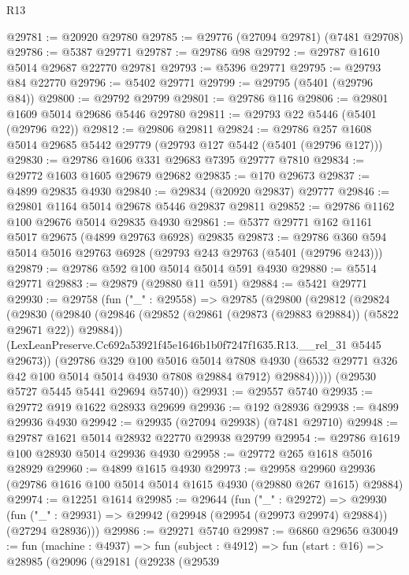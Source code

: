 \begin{lexlean}{R13}
\begin{coremodule}
@29781 := @20920 @29780
@29785 := @29776 (@27094 @29781) (@7481 @29708)
@29786 := @5387 @29771
@29787 := @29786 @98
@29792 := @29787 @1610 @5014 @29687 @22770 @29781
@29793 := @5396 @29771
@29795 := @29793 @84 @22770
@29796 := @5402 @29771
@29799 := @29795 (@5401 (@29796 @84))
@29800 := @29792 @29799
@29801 := @29786 @116
@29806 := @29801 @1609 @5014 @29686 @5446 @29780
@29811 := @29793 @22 @5446 (@5401 (@29796 @22))
@29812 := @29806 @29811
@29824 := @29786 @257 @1608 @5014 @29685 @5442 @29779 (@29793 @127 @5442 (@5401 (@29796 @127)))
@29830 := @29786 @1606 @331 @29683 @7395 @29777 @7810
@29834 := @29772 @1603 @1605 @29679 @29682
@29835 := @170 @29673
@29837 := @4899 @29835 @4930
@29840 := @29834 (@20920 @29837) @29777
@29846 := @29801 @1164 @5014 @29678 @5446 @29837 @29811
@29852 := @29786 @1162 @100 @29676 @5014 @29835 @4930
@29861 := @5377 @29771 @162 @1161 @5017 @29675 (@4899 @29763 @6928) @29835
@29873 := @29786 @360 @594 @5014 @5016 @29763 @6928 (@29793 @243 @29763 (@5401 (@29796 @243)))
@29879 := @29786 @592 @100 @5014 @5014 @591 @4930
@29880 := @5514 @29771
@29883 := @29879 (@29880 @11 @591)
@29884 := @5421 @29771
@29930 := @29758
    (fun ("_" : @29558) =>
    @29785
      (@29800
        (@29812
          (@29824
            (@29830
              (@29840
                (@29846 (@29852 (@29861 (@29873 (@29883 @29884)) (@5822 @29671 @22)) @29884))
                (LexLeanPreserve.Cc692a53921f45e1646b1b0f7247f1635.R13.__rel_31 @5445 @29673))
              (@29786
                @329
                @100
                @5016
                @5014
                @7808
                @4930
                (@6532 @29771 @326 @42 @100 @5014 @5014 @4930 @7808 @29884 @7912)
                @29884)))))
      (@29530 @5727 @5445 @5441 @29694 @5740))
@29931 := @29557 @5740
@29935 := @29772 @919 @1622 @28933 @29699
@29936 := @192 @28936
@29938 := @4899 @29936 @4930
@29942 := @29935 (@27094 @29938) (@7481 @29710)
@29948 := @29787 @1621 @5014 @28932 @22770 @29938 @29799
@29954 := @29786 @1619 @100 @28930 @5014 @29936 @4930
@29958 := @29772 @265 @1618 @5016 @28929
@29960 := @4899 @1615 @4930
@29973 := @29958
    @29960
    @29936
    (@29786 @1616 @100 @5014 @5014 @1615 @4930 (@29880 @267 @1615) @29884)
@29974 := @12251 @1614
@29985 := @29644
    (fun ("_" : @29272) =>
    @29930 (fun ("_" : @29931) => @29942 (@29948 (@29954 (@29973 @29974) @29884)) (@27294 @28936)))
@29986 := @29271 @5740
@29987 := @6860 @29656
@30049 := fun (machine : @4937) =>
  fun (subject : @4912) =>
  fun (start : @16) =>
  @28985
    (@29096
      (@29181
        (@29238
          (@29539

\end{coremodule}
\end{lexlean}
